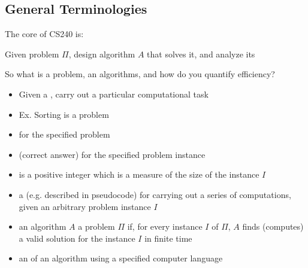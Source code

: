 \documentclass[letterpaper, 12pt]{article}
\newcommand{\red}[1]{{\color{red}{#1}}}
\begin{document}
    \subsection{General Terminologies}
    The core of CS240 is:\\
    \begin{center}
        Given problem $\Pi$, design algorithm $A$ that solves it, and analyze its \red{efficiency}
    \end{center}
    So what is a problem, an algorithms, and how do you quantify efficiency?\\
    \bigskip
    \red{Problem}
    \begin{itemize}
        \item Given a \red{problem instance}, carry out a particular computational task
        \item Ex. Sorting is a problem
    \end{itemize}
    \red{Problem Instance}
    \begin{itemize}
        \item \red{Input} for the specified problem
    \end{itemize}
    \red{Problem Solution}
    \begin{itemize}
        \item \red{Output} (correct answer) for the specified problem instance
    \end{itemize}
    \red{Size of a problem instance}
    \begin{itemize}
        \item \red{$Size(I)$} is a positive integer which is a measure of the size of the instance $I$
    \end{itemize}

    \bigskip

    \red{Algorithm}
    \begin{itemize}
        \item a \red{step-by-step process} (e.g. described in pseudocode) for carrying out a series of computations,
        given an arbitrary problem instance $I$
    \end{itemize}
    \red{Algorithm solving a problem}
    \begin{itemize}
        \item an algorithm $A$ \red{solves} a problem $\Pi$ if, for every instance $I$ of $\Pi$, $A$ finds
        (computes) a valid solution for the instance $I$ in finite time
    \end{itemize}
    \red{Program}
    \begin{itemize}
        \item an \red{implementation} of an algorithm using a specified computer language
    \end{itemize}
\end{document}
